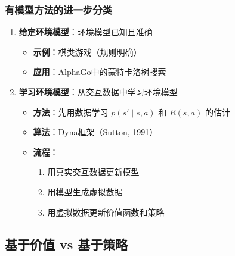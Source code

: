 \subsubsection{有模型方法的进一步分类}
\begin{enumerate}
    \item \textbf{给定环境模型}：环境模型已知且准确
    \begin{itemize}
        \item \textbf{示例}：棋类游戏（规则明确）
        \item \textbf{应用}：AlphaGo中的蒙特卡洛树搜索
    \end{itemize}
    
    \item \textbf{学习环境模型}：从交互数据中学习环境模型
    \begin{itemize}
        \item \textbf{方法}：先用数据学习 $p(s' \mid s, a)$ 和 $R(s, a)$ 的估计
        \item \textbf{算法}：Dyna框架（Sutton, 1991）
        \item \textbf{流程}：
        \begin{enumerate}
            \item 用真实交互数据更新模型
            \item 用模型生成虚拟数据
            \item 用虚拟数据更新价值函数和策略
        \end{enumerate}
    \end{itemize}
\end{enumerate}

\subsection{基于价值 vs 基于策略}

